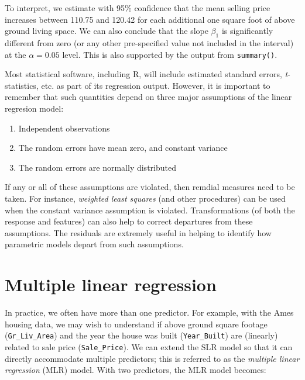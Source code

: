 \documentclass[]{krantz}
\makeatletter
\newenvironment{Shaded}{\begin{snugshade}}{\end{snugshade}}
\newcommand{\CommentTok}[1]{\textcolor[rgb]{0.37,0.37,0.37}{\textit{#1}}}
\newcommand{\DataTypeTok}[1]{\textcolor[rgb]{0.27,0.27,0.27}{#1}}
\newcommand{\FloatTok}[1]{\textcolor[rgb]{0.06,0.06,0.06}{#1}}
\newcommand{\KeywordTok}[1]{\textcolor[rgb]{0.27,0.27,0.27}{\textbf{#1}}}
\newcommand{\NormalTok}[1]{#1}
\providecommand{\tightlist}{%
  \setlength{\itemsep}{0pt}\setlength{\parskip}{0pt}}
\newenvironment{kframe}{%
\medskip{}
\setlength{\fboxsep}{.8em}
 \def\at@end@of@kframe{}%
 \ifinner\ifhmode%
  \def\at@end@of@kframe{\end{minipage}}%
  \begin{minipage}{\columnwidth}%
 \fi\fi%
 \def\FrameCommand##1{\hskip\@totalleftmargin \hskip-\fboxsep
 \colorbox{shadecolor}{##1}\hskip-\fboxsep
     \hskip-\linewidth \hskip-\@totalleftmargin \hskip\columnwidth}%
 \MakeFramed {\advance\hsize-\width
   \@totalleftmargin\z@ \linewidth\hsize
   \@setminipage}}%
 {\par\unskip\endMakeFramed%
 \at@end@of@kframe}
\renewenvironment{Shaded}{\begin{kframe}}{\end{kframe}}
\let\BeginKnitrBlock\begin \let\EndKnitrBlock\end
\makeatother
\begin{document}
\begin{Shaded}
\end{Shaded}

To interpret, we estimate with 95\% confidence that the mean selling price increases between 110.75 and 120.42 for each additional one square foot of above ground living space. We can also conclude that the slope \(\beta_1\) is significantly different from zero (or any other pre-specified value not included in the interval) at the \(\alpha = 0.05\) level. This is also supported by the output from \texttt{summary()}.

\BeginKnitrBlock{note}
Most statistical software, including R, will include estimated standard errors, \emph{t}-statistics, etc. as part of its regression output. However, it is important to remember that such quantities depend on three major assumptions of the linear regresion model:

\begin{enumerate}
\def\labelenumi{\arabic{enumi}.}
\tightlist
\item
  Independent observations
\item
  The random errors have mean zero, and constant variance
\item
  The random errors are normally distributed
\end{enumerate}

If any or all of these assumptions are violated, then remdial measures need to be taken. For instance, \emph{weighted least squares} (and other procedures) can be used when the constant variance assumption is violated. Transformations (of both the response and features) can also help to correct departures from these assumptions. The residuals are extremely useful in helping to identify how parametric models depart from such assumptions.
\EndKnitrBlock{note}

\hypertarget{multi-lm}{%
\section{Multiple linear regression}\label{multi-lm}}

In practice, we often have more than one predictor. For example, with the Ames housing data, we may wish to understand if above ground square footage (\texttt{Gr\_Liv\_Area}) and the year the house was built (\texttt{Year\_Built}) are (linearly) related to sale price (\texttt{Sale\_Price}). We can extend the SLR model so that it can directly accommodate multiple predictors; this is referred to as the \emph{multiple linear regression} (MLR) model. With two predictors, the MLR model becomes:
\end{document}
